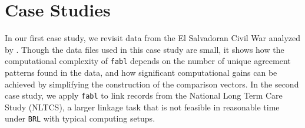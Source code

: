 \documentclass[ba]{imsart}
\begin{document}
	
	\section{Case Studies}
	\label{sec:case-studies}
	
	In our first case study, we revisit data from the El Salvadoran Civil War analyzed by \cite{sadinle_bayesian_2017}. Though the data files used in this case study are small, it shows how the computational complexity of \texttt{fabl} depends on the number of unique agreement patterns found in the data, and how significant computational gains can be achieved by simplifying the construction of the comparison vectors. In the second case study, we apply \texttt{fabl} to link records from the National Long Term Care Study (NLTCS), a larger linkage task that is not feasible in reasonable time under \texttt{BRL} with typical computing setups. 
	
\end{document}
